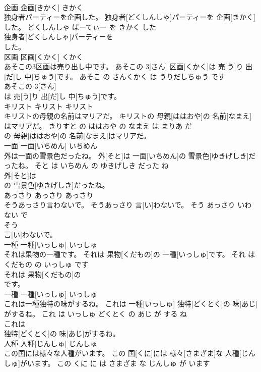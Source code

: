\documentclass[8pt]{extreport}
\begin{document}
\begin{CJK}{UTF8}{min}
\\	企画	企画[きかく]	きかく	
\\	独身者パーティーを企画した。	独身者[どくしんしゃ]パーティーを 企画[きかく]した。	どくしんしゃ ぱーてぃー を きかく した	
\\	独身者[どくしんしゃ]パーティーを
\\	した。			
\\	区画	区画[くかく]	くかく	
\\	あそこの3区画は売り出し中です。	あそこの 3[さん] 区画[くかく]は 売[う]り 出[だ]し 中[ちゅう]です。	あそこ の さんくかく は うりだしちゅう です	
\\	あそこの 3[さん]
\\	は 売[う]り 出[だ]し 中[ちゅう]です。			
\\	キリスト	キリスト	キリスト	
\\	キリストの母親の名前はマリアだ。	キリストの 母親[ははおや]の 名前[なまえ]はマリアだ。	きりすと の ははおや の なまえ は まりあ だ	
\\	の 母親[ははおや]の 名前[なまえ]はマリアだ。			
\\	一面	一面[いちめん]	いちめん	
\\	外は一面の雪景色だったね。	外[そと]は 一面[いちめん]の 雪景色[ゆきげしき]だったね。	そと は いちめん の ゆきげしき だった ね	
\\	外[そと]は
\\	の 雪景色[ゆきげしき]だったね。			
\\	あっさり	あっさり	あっさり	
\\	そうあっさり言わないで。	そうあっさり 言[い]わないで。	そう あっさり いわない で	
\\	そう
\\	言[い]わないで。			
\\	一種	一種[いっしゅ]	いっしゅ	
\\	それは果物の一種です。	それは 果物[くだもの]の 一種[いっしゅ]です。	それ は くだもの の いっしゅ です	
\\	それは 果物[くだもの]の
\\	です。			
\\	一種	一種[いっしゅ]	いっしゅ	
\\	これは一種独特の味がするね。	これは 一種[いっしゅ] 独特[どくとく]の 味[あじ]がするね。	これ は いっしゅ どくとく の あじ が する ね	
\\	これは
\\	独特[どくとく]の 味[あじ]がするね。			
\\	人種	人種[じんしゅ]	じんしゅ	
\\	この国には様々な人種がいます。	この 国[くに]には 様々[さまざま]な 人種[じんしゅ]がいます。	この くに に は さまざま な じんしゅ が います	

\end{CJK}
\end{document}
